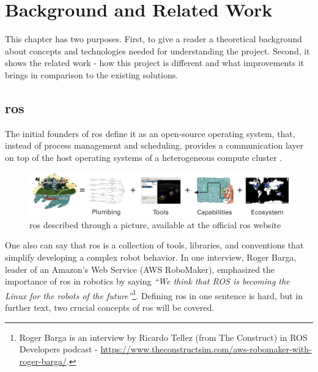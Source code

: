 \chapter{Background and Related Work}
\label{chap:background}

This chapter has two purposes.
First, to give a reader a theoretical background about concepts and technologies needed for understanding the project.
Second, it shows the related work - how this project is different and what improvements it brings in comparison to the existing solutions.

\section{\ac{ros}}

The initial founders of \ac{ros} define it as an open-source operating system, that, instead of process management and scheduling, provides a communication layer on top of the host operating systems of a heterogeneous compute cluster \cite{quigley_ros_nodate}.

\begin{figure}[H]
    \centering
    \includegraphics[width=\textwidth]{background/figures/ros_equation.png}
    \caption{\ac{ros} described through a picture, available at the official \ac{ros} website}
    \label{fig:background:ros_equation}
\end{figure}

One also can say that \ac{ros} is a collection of tools, libraries, and conventions that simplify developing a complex robot behavior.
In one interview, Roger Barga, leader of an Amazon's Web Service (AWS RoboMaker), emphasized the importance of \ac{ros} in robotics by saying \textit{``We think that ROS is becoming the Linux for the robots of the future''}\footnote{Roger Barga is an interview by Ricardo Tellez (from The Construct) in ROS Developers podcast -    \url{https://www.theconstructsim.com/aws-robomaker-with-roger-barga/}.}.
Defining \ac{ros} in one sentence is hard, but in further text, two crucial concepts of \ac{ros} will be covered.

